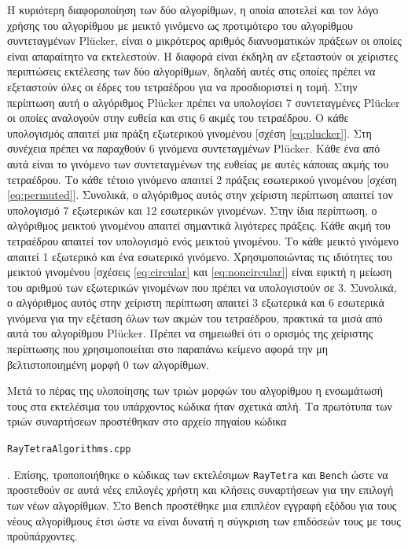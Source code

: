 Η κυριότερη διαφοροποίηση των δύο αλγορίθμων, η οποία αποτελεί και τον λόγο χρήσης του αλγορίθμου με μεικτό γινόμενο ως προτιμότερο του αλγορίθμου συντεταγμένων Plücker, είναι ο μικρότερος αριθμός διανυσματικών πράξεων οι οποίες είναι απαραίτητο να εκτελεστούν. Η διαφορά είναι έκδηλη αν εξεταστούν οι χείριστες περιπτώσεις εκτέλεσης των δύο αλγορίθμων, δηλαδή αυτές στις οποίες πρέπει να εξεταστούν όλες οι έδρες του τετραέδρου για να προσδιοριστεί η τομή. Στην περίπτωση αυτή ο αλγόριθμος Plücker πρέπει να υπολογίσει 7 συντεταγμένες Plücker οι οποίες αναλογούν στην ευθεία και στις 6 ακμές του τετραέδρου. Ο κάθε υπολογισμός απαιτεί μια πράξη εξωτερικού γινομένου [σχέση \eqref{eq:plucker}]. Στη συνέχεια πρέπει να παραχθούν 6 γινόμενα συντεταγμένων Plücker. Κάθε ένα από αυτά είναι το γινόμενο των συντεταγμένων της ευθείας με αυτές κάποιας ακμής του τετραέδρου. Το κάθε τέτοιο γινόμενο απαιτεί 2 πράξεις εσωτερικού γινομένου [σχέση \eqref{eq:permuted}]. Συνολικά, ο αλγόριθμος αυτός στην χείριστη περίπτωση απαιτεί τον 
υπολογισμό 7 εξωτερικών και 12 εσωτερικών γινομένων. Στην ίδια περίπτωση, ο αλγόριθμος μεικτού γινομένου απαιτεί σημαντικά λιγότερες πράξεις. Κάθε ακμή του τετραέδρου απαιτεί τον υπολογισμό ενός μεικτού γινομένου. Το κάθε μεικτό γινόμενο απαιτεί 1 εξωτερικό και ένα εσωτερικό γινόμενο. Χρησιμοποιώντας τις ιδιότητες του μεικτού γινομένου [σχέσεις \eqref{eq:circular} και \eqref{eq:noncircular}] είναι εφικτή η μείωση του αριθμού των εξωτερικών γινομένων που πρέπει να υπολογιστούν σε 3. Συνολικά, ο αλγόριθμος αυτός στην χείριστη περίπτωση απαιτεί 3 εξωτερικά και 6 εσωτερικά γινόμενα για την εξέταση όλων των ακμών του τετραέδρου, πρακτικά τα μισά από αυτά του αλγορίθμου  Plücker. Πρέπει να σημειωθεί ότι ο ορισμός της χείριστης περίπτωσης που χρησιμοποιείται στο παραπάνω κείμενο αφορά την μη βελτιστοποιημένη μορφή 0 των αλγορίθμων.

Μετά το πέρας της υλοποίησης των τριών μορφών του αλγορίθμου η ενσωμάτωσή τους στα εκτελέσιμα του υπάρχοντος κώδικα ήταν σχετικά απλή. Τα πρωτότυπα των τριών συναρτήσεων προστέθηκαν στο αρχείο πηγαίου κώδικα \begin{english}\verb!RayTetraAlgorithms.cpp!\end{english}. Επίσης, τροποποιήθηκε ο κώδικας των εκτελέσιμων \verb!RayTetra! και \verb!Bench! ώστε να προστεθούν σε αυτά νέες επιλογές χρήστη και κλήσεις συναρτήσεων  για την επιλογή των νέων αλγορίθμων. Στο \verb!Bench! προστέθηκε μια επιπλέον εγγραφή εξόδου για τους νέους αλγορίθμους έτσι ώστε να είναι δυνατή η σύγκριση των επιδόσεών τους με τους προϋπάρχοντες.
  

